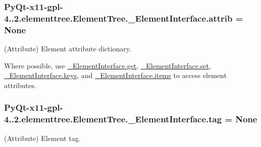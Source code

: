 \subsubsection[{attrib}]{\setlength{\rightskip}{0pt plus 5cm}Py\+Qt-\/x11-\/gpl-\/4..\+2.elementtree.\+Element\+Tree.\+\_\+\+Element\+Interface.\+attrib = None\hspace{0.3cm}{\ttfamily [static]}}\label{classPyQt-x11-gpl-4_811_82_1_1elementtree_1_1ElementTree_1_1__ElementInterface_a6c2d134d12783c0b1224c7d56b9ee7ca}


(Attribute) Element attribute dictionary. 

Where possible, use \hyperlink{}{\+\_\+\+Element\+Interface.\+get}, \hyperlink{}{\+\_\+\+Element\+Interface.\+set}, \hyperlink{}{\+\_\+\+Element\+Interface.\+keys}, and \hyperlink{}{\+\_\+\+Element\+Interface.\+items} to access element attributes. \hypertarget{classPyQt-x11-gpl-4_811_82_1_1elementtree_1_1ElementTree_1_1__ElementInterface_a58f5ef5e7535a8ebf5a0c8037d773759}{}
\subsubsection[{tag}]{\setlength{\rightskip}{0pt plus 5cm}Py\+Qt-\/x11-\/gpl-\/4..\+2.elementtree.\+Element\+Tree.\+\_\+\+Element\+Interface.\+tag = None\hspace{0.3cm}{\ttfamily [static]}}\label{classPyQt-x11-gpl-4_811_82_1_1elementtree_1_1ElementTree_1_1__ElementInterface_a58f5ef5e7535a8ebf5a0c8037d773759}


(Attribute) Element tag. 

\hypertarget{classPyQt-x11-gpl-4_811_82_1_1elementtree_1_1ElementTree_1_1__ElementInterface_a4b21c817f69f1ac09402c88eef377f09}{}
